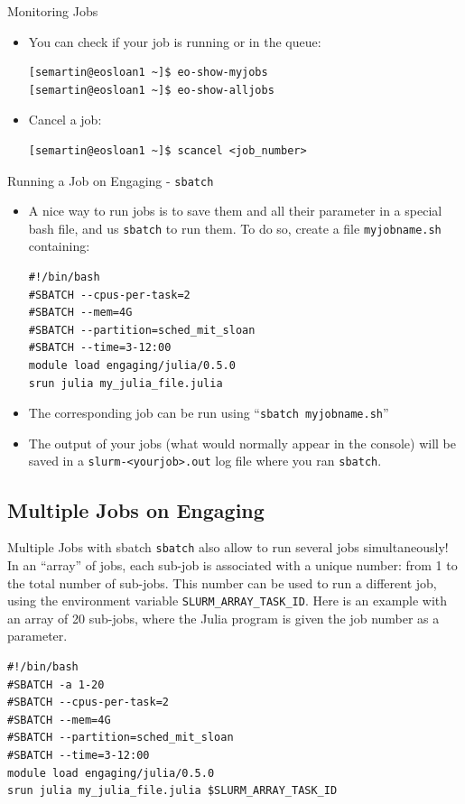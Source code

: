 \documentclass{beamer}
\begin{document}
\begin{frame}[fragile]{Monitoring Jobs}
  \begin{itemize}
    \item You can check if your job is running or in the queue:
      \begin{verbatim}
[semartin@eosloan1 ~]$ eo-show-myjobs
[semartin@eosloan1 ~]$ eo-show-alljobs
      \end{verbatim}
    \item Cancel a job:
      \begin{verbatim}
[semartin@eosloan1 ~]$ scancel <job_number>
      \end{verbatim}
  \end{itemize}
\end{frame}

\begin{frame}[fragile]{Running a Job on Engaging - \texttt{sbatch}}
  \begin{itemize}
    \item  A nice way to run jobs is to save them and all their parameter in a special bash file, and us \alert{\texttt{sbatch}} to run them. To do so, create a file \texttt{myjobname.sh} containing:
      \begin{verbatim}
#!/bin/bash
#SBATCH --cpus-per-task=2
#SBATCH --mem=4G
#SBATCH --partition=sched_mit_sloan
#SBATCH --time=3-12:00
module load engaging/julia/0.5.0
srun julia my_julia_file.julia
      \end{verbatim}
    \item The corresponding job can be run using ``\texttt{sbatch myjobname.sh}''
    \item The output of your jobs (what would normally appear in the console) will be saved in a \texttt{slurm-<yourjob>.out} log file where you ran \texttt{sbatch}.
  \end{itemize}
\end{frame}

\subsection{Multiple Jobs on Engaging}

\begin{frame}[fragile]{Multiple Jobs with sbatch}
  \texttt{sbatch} also allow to run several jobs simultaneously! In an ``array'' of jobs, each sub-job is associated with a unique number: from 1 to the total number of sub-jobs. This number can be used to run a different job, using the environment variable \alert{\texttt{SLURM\_ARRAY\_TASK\_ID}}. Here is an example with an array of 20 sub-jobs, where the Julia program is given the job number as a parameter.
  \begin{verbatim}
#!/bin/bash
#SBATCH -a 1-20
#SBATCH --cpus-per-task=2
#SBATCH --mem=4G
#SBATCH --partition=sched_mit_sloan
#SBATCH --time=3-12:00
module load engaging/julia/0.5.0
srun julia my_julia_file.julia $SLURM_ARRAY_TASK_ID
  \end{verbatim}
\end{frame}
\end{document}
